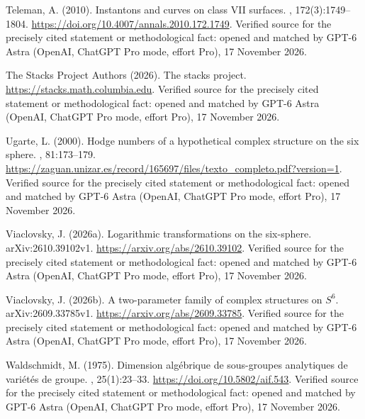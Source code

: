\begin{thebibliography}{}
Teleman, A. (2010).
\newblock Instantons and curves on class {VII} surfaces.
, 172(3):1749--1804.
\newblock \url{https://doi.org/10.4007/annals.2010.172.1749}. Verified source for the precisely cited statement or methodological fact: opened and matched by GPT-6 Astra (OpenAI, ChatGPT Pro mode, effort Pro), 17 November 2026.

{The Stacks Project Authors} (2026).
\newblock The stacks project.
\newblock \url{https://stacks.math.columbia.edu}. Verified source for the precisely cited statement or methodological fact: opened and matched by GPT-6 Astra (OpenAI, ChatGPT Pro mode, effort Pro), 17 November 2026.

Ugarte, L. (2000).
\newblock Hodge numbers of a hypothetical complex structure on the six sphere.
, 81:173--179.
\newblock \url{https://zaguan.unizar.es/record/165697/files/texto_completo.pdf?version=1}. Verified source for the precisely cited statement or methodological fact: opened and matched by GPT-6 Astra (OpenAI, ChatGPT Pro mode, effort Pro), 17 November 2026.

Viaclovsky, J. (2026a).
\newblock Logarithmic transformations on the six-sphere.
\newblock arXiv:2610.39102v1.
\newblock \url{https://arxiv.org/abs/2610.39102}. Verified source for the precisely cited statement or methodological fact: opened and matched by GPT-6 Astra (OpenAI, ChatGPT Pro mode, effort Pro), 17 November 2026.

Viaclovsky, J. (2026b).
\newblock A two-parameter family of complex structures on {$S^6$}.
\newblock arXiv:2609.33785v1.
\newblock \url{https://arxiv.org/abs/2609.33785}. Verified source for the precisely cited statement or methodological fact: opened and matched by GPT-6 Astra (OpenAI, ChatGPT Pro mode, effort Pro), 17 November 2026.

Waldschmidt, M. (1975).
\newblock Dimension alg{\'e}brique de sous-groupes analytiques de
  vari{\'e}t{\'e}s de groupe.
, 25(1):23--33.
\newblock \url{https://doi.org/10.5802/aif.543}. Verified source for the precisely cited statement or methodological fact: opened and matched by GPT-6 Astra (OpenAI, ChatGPT Pro mode, effort Pro), 17 November 2026.


\end{thebibliography}
